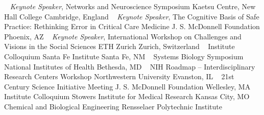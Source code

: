~
\Gap
{}
\textit{Keynote Speaker}, Networks and Neuroscience Symposium
\newline
    Kaetsu Centre, New Hall College
    \newline
Cambridge, England
\newline
~
\Gap
{}
\textit{Keynote Speaker}, The Cognitive Basis of Safe Practice: Rethinking Error in Critical Care Medicine
\newline
    J. S. McDonnell Foundation
    \newline
Phoenix, AZ
\newline
~
\Gap
{}
\textit{Keynote Speaker}, International Workshop on Challenges and Visions in the Social Sciences
\newline
    ETH Zurich
    \newline
Zurich, Switzerland
\newline
~
\Gap
{}
Institute Colloquium
\newline
    Santa Fe Institute
    \newline
Santa Fe, NM
\newline
~
\Gap
{}
Systems Biology Symposium
\newline
    National Institutes of Health
    \newline
Bethesda, MD
\newline
~
\Gap
{}
NIH Roadmap -- Interdisciplinary Research Centers Workshop
\newline
    Northwestern University
    \newline
Evanston, IL
\newline
~
\Gap
{}
21st Century Science Initiative Meeting
\newline
    J. S. McDonnell Foundation
    \newline
Wellesley, MA
\newline
~
\Gap
{}
Institute Colloquium
\newline
    Stowers Institute for Medical Research
    \newline
Kansas City, MO
\newline
~
\Gap
{}
Chemical and Biological Engineering
\newline
    Rensselaer Polytechnic Institute
    \newline
